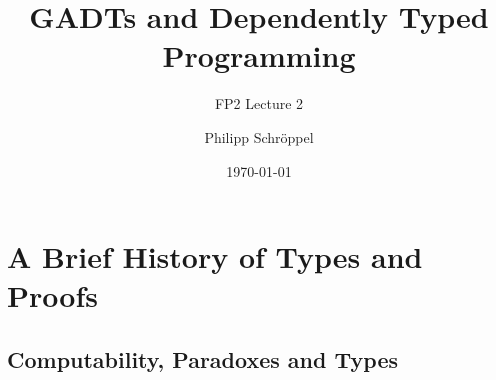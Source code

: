 \documentclass[
	aspectratio=169, %
	8pt, %
]{beamer}
\title{GADTs and Dependently Typed Programming} %
\subtitle{FP2 Lecture 2} %
\author{Philipp Schröppel} %
\date{\today} %
\begin{document}

\begin{frame}
    \tableofcontents
\end{frame}


\section{A Brief History of Types and Proofs}

\subsection{Computability, Paradoxes and Types}
\end{document}
